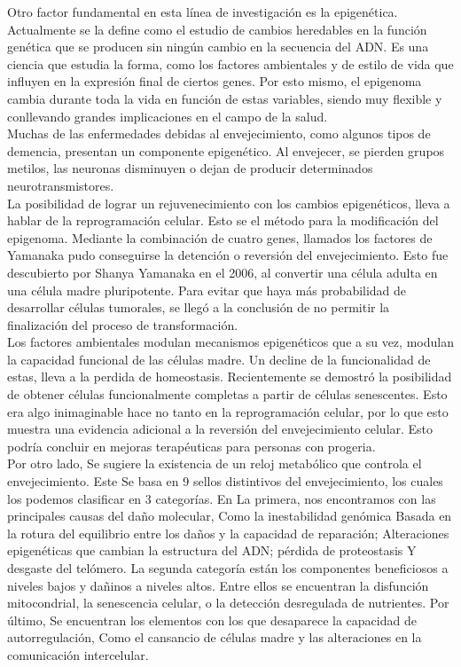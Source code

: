 \documentclass[12pt]{article}
\begin{document}
	Otro factor fundamental en esta línea de investigación es la epigenética. Actualmente se la define como el estudio de cambios heredables en la función genética que se producen sin ningún cambio en la secuencia del ADN. Es una ciencia que estudia la forma, como los factores ambientales y de estilo de vida que influyen en la expresión final de ciertos genes. Por esto mismo, el 
	epigenoma cambia durante toda la vida en función de estas variables, siendo muy flexible y conllevando grandes implicaciones en el campo de la salud.\\
	
	Muchas de las enfermedades debidas al envejecimiento, como algunos tipos de demencia, presentan un componente epigenético. Al envejecer, se pierden grupos metilos, las neuronas disminuyen o dejan de producir determinados neurotransmistores.\\
	
	La posibilidad de lograr un rejuvenecimiento con los cambios epigenéticos, lleva a hablar de la reprogramación celular. Esto se el método para la modificación del epigenoma.	Mediante la combinación de cuatro genes, llamados los factores de Yamanaka pudo conseguirse la detención o reversión del envejecimiento. Esto fue descubierto por Shanya Yamanaka en el 2006, al convertir una célula adulta en una célula madre pluripotente. Para evitar que haya más probabilidad de desarrollar células tumorales, se llegó a la conclusión de no permitir la finalización del proceso de transformación.\\
	
	Los factores ambientales modulan mecanismos epigenéticos que a su vez, modulan la capacidad funcional de las células madre.  Un decline de la funcionalidad de estas, lleva a la perdida de homeostasis. Recientemente se demostró la posibilidad de obtener células funcionalmente completas a partir de células senescentes. Esto era algo inimaginable hace no tanto en la reprogramación celular, por lo que esto muestra una evidencia adicional a la reversión del envejecimiento celular. Esto podría concluir en mejoras terapéuticas para personas con progeria.\\
	
	Por otro lado, Se sugiere la existencia de un reloj metabólico que controla el envejecimiento. Este Se basa en 9 sellos distintivos del envejecimiento, los cuales los podemos clasificar en 3 categorías. En La primera, nos encontramos con las principales causas del daño molecular, Como la inestabilidad genómica Basada en la rotura del equilibrio entre los daños y la capacidad de reparación; Alteraciones epigenéticas que cambian la estructura del ADN; pérdida de proteostasis Y desgaste del telómero. La segunda categoría están los componentes beneficiosos a niveles bajos y dañinos a niveles altos. Entre ellos se encuentran la disfunción mitocondrial, la senescencia celular, o la detección desregulada de nutrientes. Por último, Se encuentran los elementos con los que desaparece la capacidad de autorregulación, Como el cansancio de células madre y las alteraciones en la comunicación intercelular.\\
\end{document}
